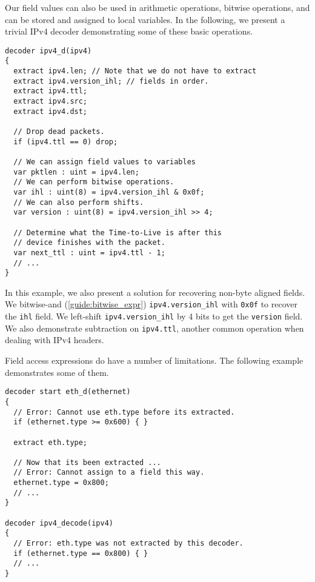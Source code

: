 Our field values can also be used in arithmetic operations, bitwise operations, and can be stored and assigned to local variables. In the following, we present a trivial IPv4 decoder demonstrating some of these basic operations.

\begin{codepage}
\begin{lstlisting}
decoder ipv4_d(ipv4)
{
  extract ipv4.len; // Note that we do not have to extract
  extract ipv4.version_ihl; // fields in order.
  extract ipv4.ttl;
  extract ipv4.src;
  extract ipv4.dst;
  
  // Drop dead packets.
  if (ipv4.ttl == 0) drop;
  
  // We can assign field values to variables
  var pktlen : uint = ipv4.len;
  // We can perform bitwise operations.
  var ihl : uint(8) = ipv4.version_ihl & 0x0f;
  // We can also perform shifts.
  var version : uint(8) = ipv4.version_ihl >> 4;
  
  // Determine what the Time-to-Live is after this
  // device finishes with the packet.
  var next_ttl : uint = ipv4.ttl - 1;
  // ...
}
\end{lstlisting}
\end{codepage}

In this example, we also present a solution for recovering non-byte aligned fields. We bitwise-and (\ref{guide:bitwise_expr}) \texttt{ipv4.version\_ihl} with \texttt{0x0f} to recover the \texttt{ihl} field. We left-shift \texttt{ipv4.version\_ihl} by 4 bits to get the \texttt{version} field. We also demonstrate subtraction on \texttt{ipv4.ttl}, another common operation when dealing with IPv4 headers.

Field access expressions do have a number of limitations. The following example demonstrates some of them.

\begin{codepage}
\begin{lstlisting}
decoder start eth_d(ethernet)
{
  // Error: Cannot use eth.type before its extracted.
  if (ethernet.type >= 0x600) { }
  
  extract eth.type;
  
  // Now that its been extracted ...
  // Error: Cannot assign to a field this way.
  ethernet.type = 0x800;
  // ...
}

decoder ipv4_decode(ipv4)
{
  // Error: eth.type was not extracted by this decoder.
  if (ethernet.type == 0x800) { }
  // ...
}
\end{lstlisting}
\end{codepage}

